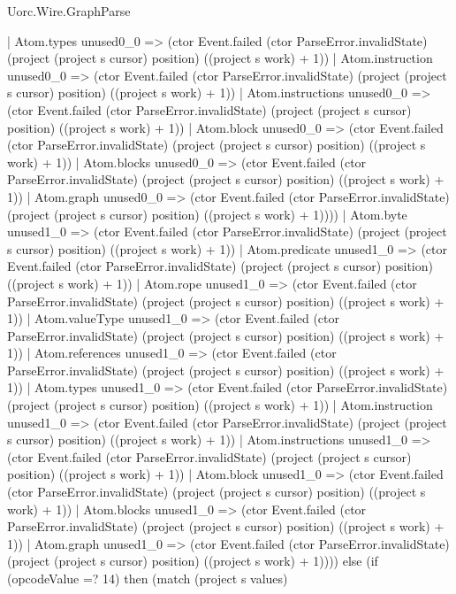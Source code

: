 \begin{lexlean}{Uorc.Wire.GraphParse}
\begin{semanticmodule}
{              | Atom.types unused0_0 => (ctor Event.failed (ctor ParseError.invalidState) (project (project s cursor) position) ((project s work) + 1))
              | Atom.instruction unused0_0 => (ctor Event.failed (ctor ParseError.invalidState) (project (project s cursor) position) ((project s work) + 1))
              | Atom.instructions unused0_0 => (ctor Event.failed (ctor ParseError.invalidState) (project (project s cursor) position) ((project s work) + 1))
              | Atom.block unused0_0 => (ctor Event.failed (ctor ParseError.invalidState) (project (project s cursor) position) ((project s work) + 1))
              | Atom.blocks unused0_0 => (ctor Event.failed (ctor ParseError.invalidState) (project (project s cursor) position) ((project s work) + 1))
              | Atom.graph unused0_0 => (ctor Event.failed (ctor ParseError.invalidState) (project (project s cursor) position) ((project s work) + 1))))
          | Atom.byte unused1_0 => (ctor Event.failed (ctor ParseError.invalidState) (project (project s cursor) position) ((project s work) + 1))
          | Atom.predicate unused1_0 => (ctor Event.failed (ctor ParseError.invalidState) (project (project s cursor) position) ((project s work) + 1))
          | Atom.rope unused1_0 => (ctor Event.failed (ctor ParseError.invalidState) (project (project s cursor) position) ((project s work) + 1))
          | Atom.valueType unused1_0 => (ctor Event.failed (ctor ParseError.invalidState) (project (project s cursor) position) ((project s work) + 1))
          | Atom.references unused1_0 => (ctor Event.failed (ctor ParseError.invalidState) (project (project s cursor) position) ((project s work) + 1))
          | Atom.types unused1_0 => (ctor Event.failed (ctor ParseError.invalidState) (project (project s cursor) position) ((project s work) + 1))
          | Atom.instruction unused1_0 => (ctor Event.failed (ctor ParseError.invalidState) (project (project s cursor) position) ((project s work) + 1))
          | Atom.instructions unused1_0 => (ctor Event.failed (ctor ParseError.invalidState) (project (project s cursor) position) ((project s work) + 1))
          | Atom.block unused1_0 => (ctor Event.failed (ctor ParseError.invalidState) (project (project s cursor) position) ((project s work) + 1))
          | Atom.blocks unused1_0 => (ctor Event.failed (ctor ParseError.invalidState) (project (project s cursor) position) ((project s work) + 1))
          | Atom.graph unused1_0 => (ctor Event.failed (ctor ParseError.invalidState) (project (project s cursor) position) ((project s work) + 1)))) else (if (opcodeValue =? 14) then (match (project s values)
}
\end{semanticmodule}
\end{lexlean}
